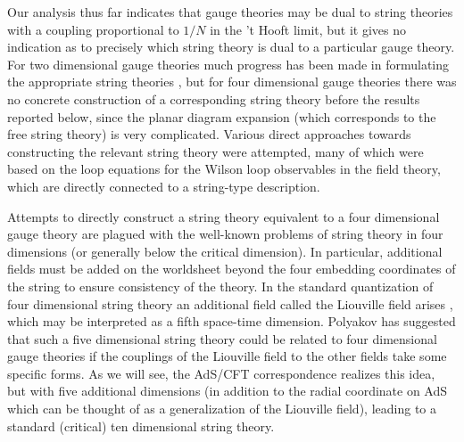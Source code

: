 Our analysis thus far indicates that gauge theories may be dual to
string theories with a coupling proportional to $1/N$ in the 't Hooft
limit, but it gives no indication as to precisely which string theory
is dual to a particular gauge theory. For two dimensional gauge
theories much progress has been made in formulating the appropriate
string theories
\cite{Gross:1993tu,Gross:1993hu,Minahan:1993sk,Gross:1993yt,Naculich:1993ve,
Ramgoolam:1993hh,Cordes:1994sd,Horava:1999wf}, 
but for four dimensional gauge
theories there was no concrete construction of a corresponding string
theory before the results reported below, since the planar diagram
expansion (which corresponds to the free string theory) is very
complicated. Various direct approaches towards constructing the
relevant string theory were attempted, many of which were based on the
loop equations \cite{Makeenko:1979pb} for the Wilson loop observables
in the field theory, which are directly connected to a string-type
description.

Attempts to directly construct a string theory equivalent to a four
dimensional gauge theory are plagued with the well-known problems of
string theory in four dimensions (or generally below the critical
dimension). In particular, additional fields must be added on the
worldsheet beyond the four embedding coordinates of the string to
ensure consistency of the theory. In the standard quantization of four
dimensional string theory an additional field called the Liouville
field arises \cite{Polyakov:1981rd}, 
which may be interpreted as a fifth space-time
dimension. Polyakov has suggested \cite{Polyakov:1997tj,
Polyakov:1998ju} that such a five dimensional string theory
could be related to four dimensional gauge theories if the couplings
of the Liouville field to the other fields take some specific
forms. As we will see, the AdS/CFT correspondence realizes this idea,
but with five additional dimensions (in addition to the radial
coordinate on AdS which can be thought of as a generalization of the
Liouville field), leading to a standard (critical) ten dimensional
string theory.




